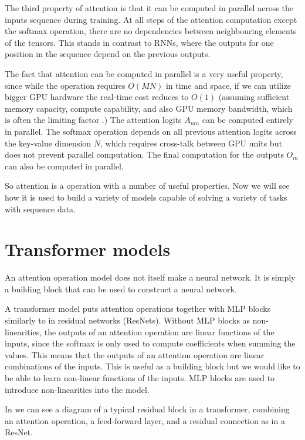 The third property of attention is that it can be computed in parallel across the inputs sequence during training. At all steps of the attention computation except the softmax operation, there are no dependencies between neighbouring elements of the tensors. This stands in contrast to RNNs, where the outputs for one position in the sequence depend on the previous outputs.

The fact that attention can be computed in parallel is a very useful property, since while the operation requires $O(MN)$ in time and space, if we can utilize bigger GPU hardware the real-time cost reduces to $O(1)$ (assuming sufficient memory capacity, compute capability, and also GPU memory bandwidth, which is often the limiting factor \cite{multi-query-attn}.) The attention logits $A_{mn}$ can be computed entirely in parallel. The softmax operation depends on all previous attention logits across the key-value dimension $N$, which requires cross-talk between GPU units but does not prevent parallel computation. The final computation for the outputs $O_m$ can also be computed in parallel.

So attention is a operation with a number of useful properties. Now we will see how it is used to build a variety of models capable of solving a variety of tasks with sequence data.

\section{Transformer models}

An attention operation model does not itself make a neural network. It is simply a building block that can be used to construct a neural network.

A transformer model puts attention operations together with MLP blocks similarly to in residual networks (ResNets). Without MLP blocks as non-linearities, the outputs of an attention operation are linear functions of the inputs, since the softmax is only used to compute coefficients when summing the values. This means that the outputs of an attention operation are linear combinations of the inputs. This is useful as a building block but we would like to be able to learn non-linear functions of the inputs. MLP blocks are used to introduce non-linearities into the model.

In  we can see a diagram of a typical residual block in a transformer, combining an attention operation, a feed-forward layer, and a residual connection as in a ResNet.

